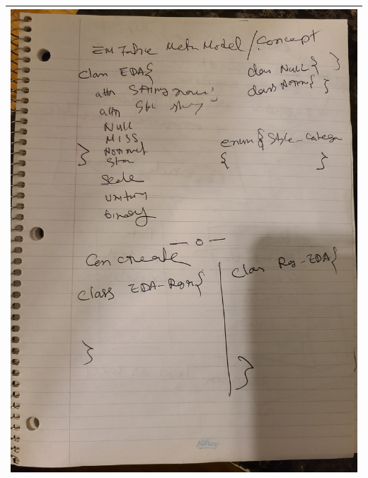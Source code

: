 \begin{tabular}{|c|}
\hline
\includegraphics[scale=0.1, angle = -90]{sketch/5.jpg} \\ 
\hline

\end{tabular}
